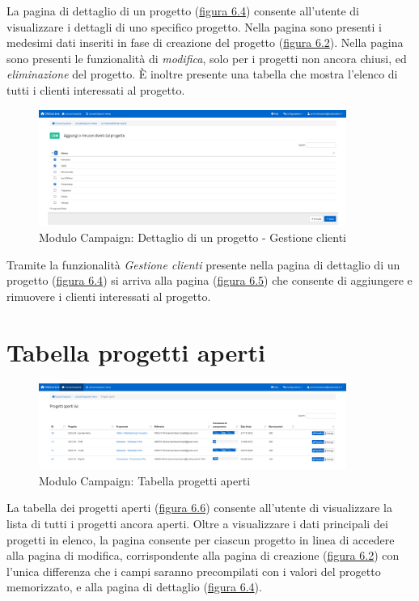 \noindent La pagina di dettaglio di un progetto ({\hyperref[fig:dettaglioProgetto]{figura 6.4}}) consente all'utente di visualizzare i dettagli di uno specifico progetto. Nella pagina sono presenti i medesimi dati inseriti in fase di creazione del progetto ({\hyperref[fig:nuovoProgetto]{figura 6.2}}). Nella pagina sono presenti le funzionalità di \textit{modifica}, solo per i progetti non ancora chiusi, ed \textit{eliminazione} del progetto. È inoltre presente una tabella che mostra l'elenco di tutti i clienti interessati al progetto. 

\begin{figure}[!h]
\centering
\includegraphics[width=380px]{../images/UI/06-aggiungiRimuoviClienti.png}
\caption{Modulo Campaign: Dettaglio di un progetto - Gestione clienti}
\label{fig:gestioneClienti}
\end{figure}

\noindent Tramite la funzionalità \textit{Gestione clienti} presente nella pagina di dettaglio di un progetto ({\hyperref[fig:dettaglioProgetto]{figura 6.4}}) si arriva alla pagina ({\hyperref[fig:gestioneClienti]{figura 6.5}}) che consente di aggiungere e rimuovere i clienti interessati al progetto.

\pagebreak

\section{Tabella progetti aperti}
\begin{figure}[!h]
\centering
\includegraphics[width=380px]{../images/UI/07-tabellaProgettiAperti.png}
\caption{Modulo Campaign: Tabella progetti aperti}
\label{fig:tabellaProgettiAperti}
\end{figure}

\noindent La tabella dei progetti aperti ({\hyperref[fig:tabellaProgettiAperti]{figura 6.6}}) consente all'utente di visualizzare la lista di tutti i progetti ancora aperti. Oltre a visualizzare i dati principali dei progetti in elenco, la pagina consente per ciascun progetto in linea di accedere alla pagina di modifica, corrispondente alla pagina di creazione ({\hyperref[fig:nuovoProgetto]{figura 6.2}}) con l'unica differenza che i campi saranno precompilati con i valori del progetto memorizzato, e alla pagina di dettaglio ({\hyperref[fig:dettaglioProgetto]{figura 6.4}}).  


